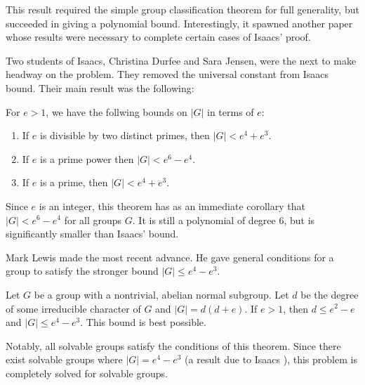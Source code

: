 \documentclass[main.tex]{subfiles}
\begin{document}
\hss

This result required the simple group classification theorem for full generality, but succeeded in giving a polynomial bound. Interestingly, it spawned another paper \cite{larsenmalletieparticle} whose results were necessary to complete certain cases of Isaacs' proof.

Two students of Isaacs, Christina Durfee and Sara Jensen, were the next to make headway on the problem. They removed the universal constant from Isaacs bound. Their main result was the following:

\hss

\begin{theorem}
For $e > 1$, we have the follwing bounds on $|G|$ in terms of $e$:
\begin{enumerate}
	\item If $e$ is divisible by two distinct primes, then $|G| < e^4 + e^3$.
	\item If $e$ is a prime power then $|G| < e^6 - e^4$.
	\item If $e$ is a prime, then $|G| < e^4 + e^3$.
\end{enumerate}
\end{theorem}

\hss

\noindent Since $e$ is an integer, this theorem has as an immediate corollary that $|G| < e^6 - e^4$ for all groups $G$. It is still a polynomial of degree 6, but is significantly smaller than Isaacs' bound.

Mark Lewis made the most recent advance. He gave general conditions \cite{lewisarticle} for a group to satisfy the stronger bound $|G| \le e^4 - e^3$.

\hss

\begin{theorem} Let $G$ be a group with a nontrivial, abelian normal subgroup. Let $d$ be the degree of some irreducible character of $G$ and $|G| = d(d+e)$. If $e > 1$, then $d \le e^2 - e$ and $|G| \le e^4 - e^3$. This bound is best possible.
\end{theorem}

\hss

\noindent Notably, all solvable groups satisfy the conditions of this theorem. Since there exist solvable groups where $|G| = e^4 - e^3$ (a result due to Isaacs \cite{isaacsarticle}), this problem is completely solved for solvable groups. 

\hss
\end{document}

